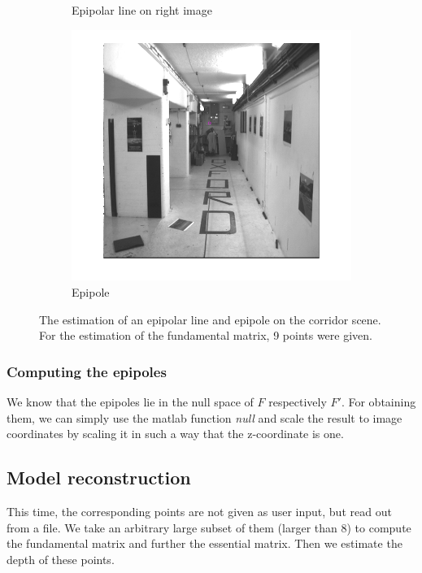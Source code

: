 \documentclass{paper}
\begin{document}
\begin{figure}
\begin{subfigure}{0.49\textwidth}
   \caption{Epipolar line on right image}
\end{subfigure}
\begin{subfigure}{0.49\textwidth}
   \includegraphics[width=\textwidth]{corridor_epipole}
   \caption{Epipole}
\end{subfigure}
\caption{The estimation of an epipolar line and epipole 
on the corridor scene. 
For the estimation of the fundamental matrix, 9 points were given.}
\label{fig:corridor}
\end{figure}

\subsubsection{Computing the epipoles}
We know that the epipoles lie in the null space of $F$ respectively $F'$. For
obtaining them, we can simply use the matlab function \emph{null} and scale 
the result to image coordinates by scaling it in such a way that 
the z-coordinate is one.
 
\subsection{Model reconstruction}
This time, the corresponding points are not given as user input, but
read out from a file. We take an arbitrary large subset of them 
(larger than 8) to compute the fundamental
matrix and further the essential matrix. Then we estimate the depth of these points.
\end{document}
